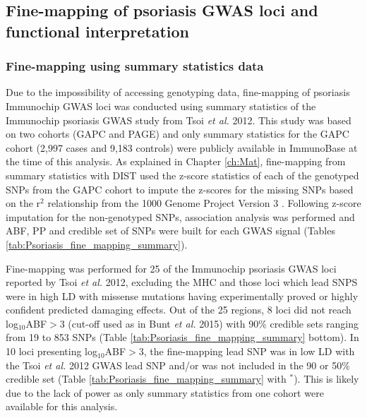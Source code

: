 \subsection{Fine-mapping of psoriasis GWAS loci and functional interpretation}

\subsubsection{Fine-mapping using summary statistics data}
Due to the impossibility of accessing genotyping data, fine-mapping of psoriasis Immunochip GWAS loci was conducted using summary statistics of the Immunochip psoriasis GWAS study from Tsoi \textit{et al.} 2012. This study was based on two cohorts (GAPC and PAGE) and only summary statistics for the GAPC cohort (2,997 cases and 9,183 controls) were publicly available in ImmunoBase at the time of this analysis. As explained in Chapter \ref{ch:Mat}, fine-mapping from summary statistics with DIST used the z-score statistics of each of the genotyped SNPs from the GAPC cohort to impute the z-scores for the missing SNPs based on the r$^2$ relationship from the 1000 Genome Project Version 3 \parencite{Lee2013}. Following z-score imputation for the non-genotyped SNPs, association analysis was performed and ABF, PP and credible set of SNPs were built for each GWAS signal (Tables \ref{tab:Psoriasis_fine_mapping_summary}).

Fine-mapping was performed for 25 of the Immunochip psoriasis GWAS loci reported by Tsoi \textit{et al.} 2012, excluding the MHC and those loci which lead SNPS were in high LD with missense mutations having experimentally proved or highly confident predicted damaging effects. Out of the 25 regions, 8 loci did not reach log$_{10}$ABF$>$3 (cut-off used as in Bunt \textit{et al.} 2015) with 90\% credible sets ranging from 19 to 853 SNPs (Table \ref{tab:Psoriasis_fine_mapping_summary} bottom). In 10 loci presenting log$_{10}$ABF$>$3, the fine-mapping lead SNP was in low LD with the Tsoi \textit{et al.} 2012 GWAS lead SNP and/or was not included in the 90 or 50\% credible set (Table \ref{tab:Psoriasis_fine_mapping_summary} with $^\ast$). This is likely due to the lack of power as only summary statistics from one cohort were available for this analysis.


